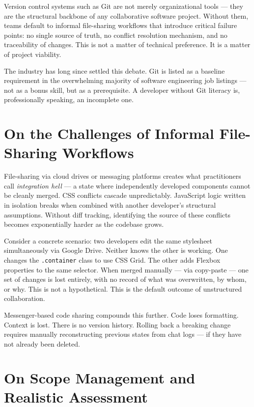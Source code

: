 \documentclass[11pt,a4paper]{book}
\begin{document}
Version control systems such as Git are not merely organizational tools --- they are the structural backbone of any collaborative software project. Without them, teams default to informal file-sharing workflows that introduce critical failure points: no single source of truth, no conflict resolution mechanism, and no traceability of changes. This is not a matter of technical preference. It is a matter of project viability.

The industry has long since settled this debate. Git is listed as a baseline requirement in the overwhelming majority of software engineering job listings --- not as a bonus skill, but as a prerequisite. A developer without Git literacy is, professionally speaking, an incomplete one.

\section{On the Challenges of Informal File-Sharing Workflows}

File-sharing via cloud drives or messaging platforms creates what practitioners call \emph{integration hell} --- a state where independently developed components cannot be cleanly merged. CSS conflicts cascade unpredictably. JavaScript logic written in isolation breaks when combined with another developer's structural assumptions. Without diff tracking, identifying the source of these conflicts becomes exponentially harder as the codebase grows.

Consider a concrete scenario: two developers edit the same stylesheet simultaneously via Google Drive. Neither knows the other is working. One changes the \texttt{.container} class to use CSS Grid. The other adds Flexbox properties to the same selector. When merged manually --- via copy-paste --- one set of changes is lost entirely, with no record of what was overwritten, by whom, or why. This is not a hypothetical. This is the default outcome of unstructured collaboration.

Messenger-based code sharing compounds this further. Code loses formatting. Context is lost. There is no version history. Rolling back a breaking change requires manually reconstructing previous states from chat logs --- if they have not already been deleted.

\section{On Scope Management and Realistic Assessment}
\end{document}
